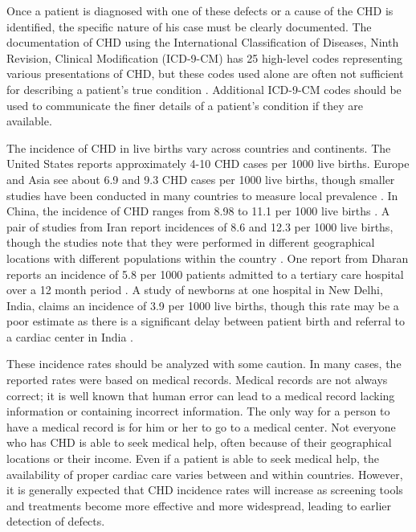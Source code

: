 Once a patient is diagnosed with one of these defects or a cause of the CHD is identified, the specific nature of his case must be clearly documented. The documentation of CHD using the International Classification of Diseases, Ninth Revision, Clinical Modification (ICD-9-CM) has 25 high-level codes representing various presentations of CHD, but these codes used alone are often not sufficient for describing a patient's true condition \cite{Mozaffarian2016}. Additional ICD-9-CM codes should be used to communicate the finer details of a patient's condition if they are available. 

The incidence of CHD in live births vary across countries and continents. The United States reports approximately 4-10 CHD cases per 1000 live births. Europe and Asia see about 6.9 and 9.3 CHD cases per 1000 live births, though smaller studies have been conducted in many countries to measure local prevalence \cite{Mozaffarian2016}. In China, the incidence of CHD ranges from 8.98 to 11.1 per 1000 live births \cite{Zhao2019} \cite{Qu2016}. 
A pair of studies from Iran report incidences of 8.6 and 12.3 per 1000 live births, though the studies note that they were performed in different geographical locations with different populations within the country \cite{Nikyar2011} \cite{Rahim2008}.
One report from Dharan reports an incidence of 5.8 per 1000 patients admitted to a tertiary care hospital over a 12 month period \cite{Shah2008}. A study of newborns at one hospital in New Delhi, India, claims an incidence of 3.9 per 1000 live births, though this rate may be a poor estimate as there is a significant delay between patient birth and referral to a cardiac center in India \cite{Khalil1994} \cite{Saxena2005}.

These incidence rates should be analyzed with some caution. In many cases, the reported rates were based on medical records. Medical records are not always correct; it is well known that human error can lead to a medical record lacking information or containing incorrect information. The only way for a person to have a medical record is for him or her to go to a medical center. Not everyone who has CHD is able to seek medical help, often because of their geographical locations or their income. Even if a patient is able to seek medical help, the availability of proper cardiac care varies between and within countries. However, it is generally expected that CHD incidence rates will increase as screening tools and treatments become more effective and more widespread, leading to earlier detection of defects.
 
